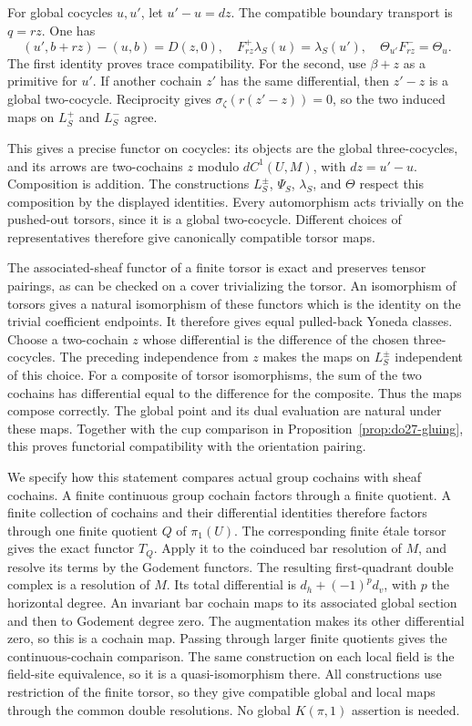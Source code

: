 For global cocycles \(u,u'\), let \(u'-u=dz\).
The compatible boundary transport is \(q=rz\).
One has
\[
 (u',b+rz)-(u,b)=D(z,0),\quad
 F_{rz}^+\lambda_S(u)=\lambda_S(u'),\quad
 \Theta_{u'}F_{rz}^-=\Theta_u.
\]
The first identity proves trace compatibility. For the second, use
\(\beta+z\) as a primitive for \(u'\).
If another cochain \(z'\) has the same differential, then
\(z'-z\) is a global two-cocycle. Reciprocity gives
\(\sigma_\zeta(r(z'-z))=0\), so the two induced maps on
\(L_S^+\) and \(L_S^-\) agree.

This gives a precise functor on cocycles: its objects are the global
three-cocycles, and its arrows are two-cochains \(z\) modulo
\(dC^1(U,M)\), with \(dz=u'-u\). Composition is addition.
The constructions \(L_S^\pm\), \(\Psi_S\), \(\lambda_S\), and
\(\Theta\) respect this composition by the displayed identities.
Every automorphism acts trivially on the pushed-out torsors, since it
is a global two-cocycle. Different choices of representatives therefore
give canonically compatible torsor maps.

The associated-sheaf functor of a finite torsor is exact and preserves
tensor pairings, as can be checked on a cover trivializing the torsor.
An isomorphism of torsors gives a natural isomorphism of these functors
which is the identity on the trivial coefficient endpoints.
It therefore gives equal pulled-back Yoneda classes. Choose a two-cochain
\(z\) whose differential is the difference of the chosen
three-cocycles. The preceding independence from \(z\) makes the
maps on \(L_S^\pm\) independent of this choice. For a composite
of torsor isomorphisms, the sum of the two cochains has differential
equal to the difference for the composite. Thus the maps compose correctly.
The global point and its dual evaluation are natural under these maps.
Together with the cup comparison in Proposition~\ref{prop:do27-gluing},
this proves functorial compatibility with the orientation pairing.

We specify how this statement compares actual group cochains with
sheaf cochains. A finite continuous group cochain factors through a
finite quotient. A finite collection of cochains and their differential
identities therefore factors through one finite quotient \(Q\) of
\(\pi_1(U)\). The corresponding finite \'etale torsor gives the
exact functor \(T_Q\). Apply it to the coinduced bar resolution of
\(M\), and resolve its terms by the Godement functors. The resulting
first-quadrant double complex is a resolution of \(M\).
Its total differential is \(d_h+(-1)^p d_v\), with \(p\) the
horizontal degree. An invariant bar cochain maps to its associated
global section and then to Godement degree zero. The augmentation
makes its other differential zero, so this is a cochain map.
Passing through larger finite quotients gives the continuous-cochain
comparison. The same construction on each local field is the
field-site equivalence, so it is a quasi-isomorphism there.
All constructions use restriction of the finite torsor, so they give
compatible global and local maps through the common double resolutions.
No global \(K(\pi,1)\) assertion is needed.

